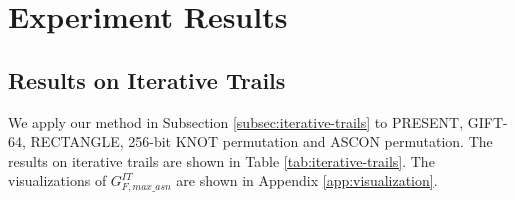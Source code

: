 \section{Experiment Results\label{sec:experiment}}

\subsection{Results on Iterative Trails}

We apply our method in Subsection \ref{subsec:iterative-trails} to PRESENT, GIFT-64, RECTANGLE, 256-bit KNOT permutation and ASCON permutation. The results on iterative trails are shown in Table \ref{tab:iterative-trails}. The visualizations of $G^{IT}_{F,max\_asn}$ are shown in Appendix \ref{app:visualization}.




